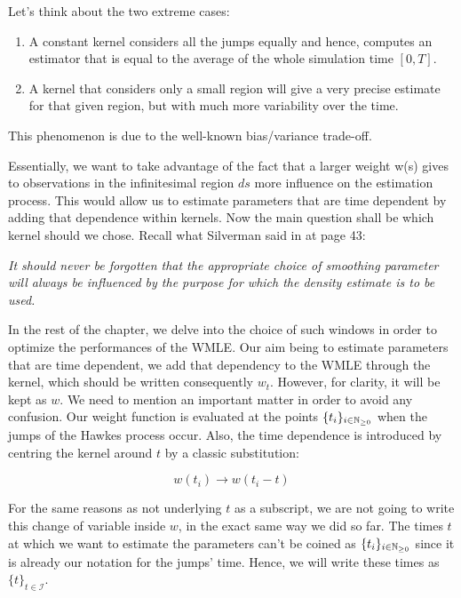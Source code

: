 \documentclass[11pt]{book}
\newcommand{\sequence}[1]{\{ #1 \}_{ i \in \N} }
\newcommand{\sequencetime}{\{t\}_{t \in \mathcal I} }
\begin{document}
Let's think about the two extreme cases: 

\begin{enumerate}
\item A constant kernel considers all the jumps equally and hence, computes an estimator that is equal to the average of the whole simulation time $[0,T]$.
\item A kernel that considers only a small region will give a very precise estimate for that given region, but with much more variability over the time.
\end{enumerate}

This phenomenon is due to the well-known bias/variance trade-off.
\label{section:bias-variance_trade-off}

Essentially, we want to take advantage of the fact that a larger weight w(s) gives to observations in the infinitesimal region $ds$ more influence on the estimation process. This would allow us to estimate parameters that are time dependent by adding that dependence within kernels. Now the main question shall be which kernel should we chose. Recall what Silverman said in \cite{Silverman} at page 43:

\vspace{0.5cm}
\textit{It should never be forgotten that the appropriate choice of smoothing parameter will always be influenced by the purpose for which the density estimate is to be used. }
\vspace{0.5cm}


\label{section:kernel_weights_first_conversation}
In the rest of the chapter, we delve into the choice of such windows in order to optimize the performances of the WMLE. Our aim being to estimate parameters that are time dependent, we add that dependency to the WMLE through the kernel, which should be written consequently $w_t$. However, for clarity, it will be kept as $w$. We need to mention an important matter in order to avoid any confusion. Our weight function is evaluated at the points $\sequence{t_i}$ when the jumps of the Hawkes process occur. Also, the time dependence is introduced by centring the kernel around $t$ by a classic substitution: 

$$w(t_i) \to w(  t_i - t ) $$

For the same reasons as not underlying $t$ as a subscript, we are not going to write this change of variable inside $w$, in the exact same way we did so far. The times $t$ at which we want to estimate the parameters can't be coined as $\sequence{t_i}$ since it is already our notation for the jumps' time. Hence, we will write these times as $\sequencetime$.
\end{document}
